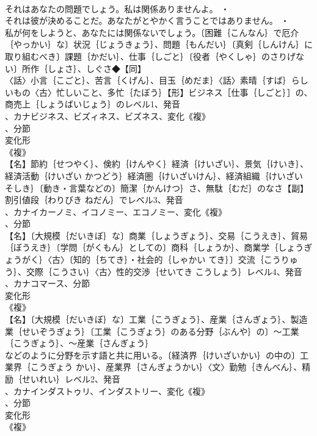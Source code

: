 \documentclass[8pt]{extreport}
\begin{document}
\begin{CJK}{UTF8}{min}
\\	それはあなたの問題でしょう。私は関係ありませんよ。 ・
\\	それは彼が決めることだ。あなたがとやかく言うことではありません。 ・
\\	私が何をしようと、あなたには関係ないでしょう。〔困難｛こんなん｝で厄介｛やっかい｝な〕状況｛じょうきょう｝、問題｛もんだい｝〔真剣｛しんけん｝に取り組むべき〕課題｛かだい｝、仕事｛しごと｝〔役者｛やくしゃ｝のさりげない〕所作｛しょさ｝、しぐさ◆【同】
\\	〈話〉小言｛こごと｝、苦言｛くげん｝、目玉｛めだま｝〈話〉素晴｛すば｝らしいもの〈古〉忙しいこと、多忙｛たぼう｝【形】ビジネス［仕事｛しごと｝］の、商売上｛しょうばいじょう｝のレベル1、発音
\\	、カナビジネス、ビズィネス、ビズネス、変化《複》
\\	、分節
\\	変化形 
\\	《複》
\\	【名】節約｛せつやく｝、倹約｛けんやく｝経済｛けいざい｝、景気｛けいき｝、経済活動｛けいざい かつどう｝経済圏｛けいざいけん｝、経済組織｛けいざい そしき｝〔動き・言葉などの〕簡潔｛かんけつ｝さ、無駄｛むだ｝のなさ【副】割引値段｛わりびき ねだん｝でレベル3、発音
\\	、カナイカーノミ、イコノミー、エコノミー、変化《複》
\\	、分節
\\	【名】〔大規模｛だいきぼ｝な〕商業｛しょうぎょう｝、交易｛こうえき｝、貿易｛ぼうえき｝〔学問｛がくもん｝としての〕商科｛しょうか｝、商業学｛しょうぎょうがく｝〈古〉〔知的｛ちてき｝・社会的｛しゃかい てき｝〕交流｛こうりゅう｝、交際｛こうさい｝〈古〉性的交渉｛せいてき こうしょう｝レベル4、発音
\\	、カナコマース、分節
\\	変化形 
\\	《複》
\\	【名】〔大規模｛だいきぼ｝な〕工業｛こうぎょう｝、産業｛さんぎょう｝、製造業｛せいぞうぎょう｝〔工業｛こうぎょう｝のある分野｛ぶんや｝の〕～工業｛こうぎょう｝、～産業｛さんぎょう｝
\\	などのように分野を示す語と共に用いる。〔経済界｛けいざいかい｝の中の〕工業界｛こうぎょう かい｝、産業界｛さんぎょうかい｝〈文〉勤勉｛きんべん｝、精励｛せいれい｝レベル2、発音
\\	、カナインダストゥリ、インダストリー、変化《複》
\\	、分節
\\	変化形 
\\	《複》

\end{CJK}
\end{document}
